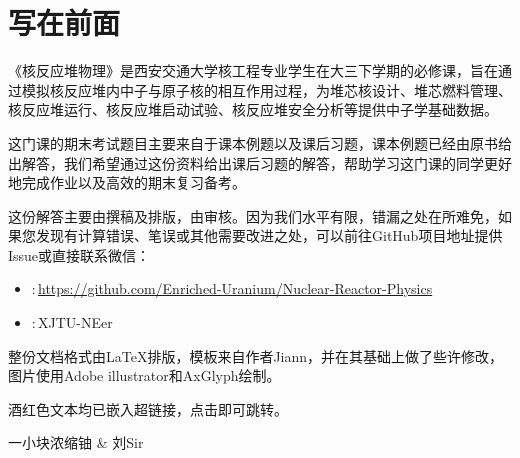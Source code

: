 \chapter*{写在前面}

《核反应堆物理》是西安交通大学核工程专业学生在大三下学期的必修课，旨在通过模拟核反应堆内中子与原子核的相互作用过程，为堆芯核设计、堆芯燃料管理、核反应堆运行、核反应堆启动试验、核反应堆安全分析等提供中子学基础数据。

这门课的期末考试题目主要来自于课本例题以及课后习题，课本例题已经由原书给出解答，我们希望通过这份资料给出课后习题的解答，帮助学习这门课的同学更好地完成作业以及高效的期末复习备考。

这份解答主要由\;撰稿及排版，由\;审核。因为我们水平有限，错漏之处在所难免，如果您发现有计算错误、笔误或其他需要改进之处，可以前往GitHub项目地址提供Issue或直接联系微信：

\begin{itemize}
    \item {\faGithub}:\,\href{https://github.com/Enriched-Uranium/Nuclear-Reactor-Physics}{https://github.com/Enriched-Uranium/Nuclear-Reactor-Physics}
    \item {\faWeixin}:\,XJTU-NEer
\end{itemize}

整份文档格式由\LaTeX{}排版，模板来自\href{https://zhuanlan.zhihu.com/p/601085820}{\faZhihu}作者Jiann，并在其基础上做了些许修改，图片使用Adobe illustrator和AxGlyph绘制。

酒红色文本均已嵌入超链接，点击即可跳转。

\begin{flushright}
    {\kaishu 一小块浓缩铀 \& 刘Sir} \\
    \zhtoday
\end{flushright}
